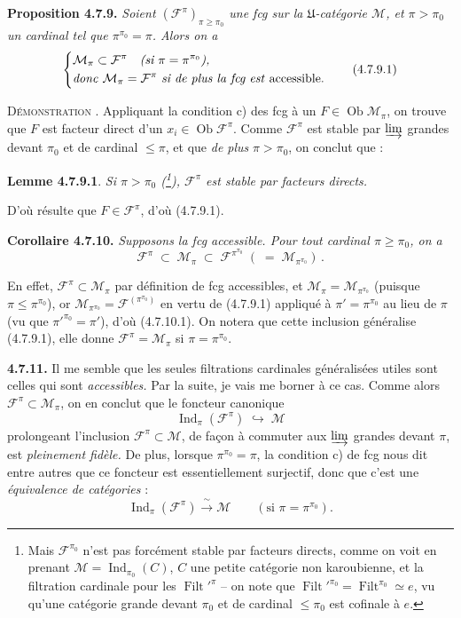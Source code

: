 \documentclass[11pt]{article}
\newcommand{\printedpage}[1]{\marginpar{\footnotesize p.~#1}}
\newcommand{\msp}[1]{\marginpar{\footnotesize [#1]}}
\newcommand{\Filt}{\operatorname{Filt}}
\newcommand{\Ob}{\operatorname{Ob}}
\newcommand{\Ind}{\operatorname{Ind}}
\begin{document}
\textbf{Proposition 4.7.9.} \textit{Soient $(\mathcal{F}^{\pi})_{\pi\geqslant\pi_0}$ une fcg sur la $\mathfrak{U}$-catégorie $\mathcal{M}$, et $\pi>\pi_0$ un cardinal tel que $\pi^{\pi_0}=\pi$. Alors on a}
\printedpage{60}
\msp{page 177}
\[
\left\{
\begin{aligned}
&\mathcal{M}_\pi\subset\mathcal{F}^{\pi}\quad\text{\textit{(si $\pi=\pi^{\pi_0}$),}}\\
&\text{\textit{donc} }\mathcal{M}_\pi=\mathcal{F}^{\pi}\text{ \textit{si de plus la fcg est} accessible.}
\end{aligned}
\right.
\tag*{(4.7.9.1)}
\]

\textsc{Démonstration} . Appliquant la condition c) des fcg à un $F\in\Ob\mathcal{M}_\pi$, on trouve que $F$ est facteur direct d'un $x_i\in\Ob\mathcal{F}^{\pi}$. Comme $\mathcal{F}^{\pi}$ est stable par $\varinjlim$ grandes devant $\pi_0$ et de cardinal $\leqslant\pi$, et que \textit{de plus} $\pi>\pi_0$, on conclut que :

\textbf{Lemme 4.7.9.1}. \textit{Si $\pi>\pi_0$ (\footnote[76]{Mais $\mathcal{F}^{\pi_0}$ n'est pas forcément stable par facteurs directs, comme on voit en prenant $\mathcal{M}=\Ind_{\pi_0}(C)$, $C$ une petite catégorie non karoubienne, et la filtration cardinale pour les $\Filt'^{\pi}$ -- on note que $\Filt'^{\pi_0}=\Filt^{\pi_0}\simeq e$, vu qu'une catégorie grande devant $\pi_0$ et de cardinal $\leqslant\pi_0$ est cofinale à $e$.}), $\mathcal{F}^{\pi}$ est stable par facteurs directs.}

D'où résulte que $F\in\mathcal{F}^{\pi}$, d'où (4.7.9.1).

\textbf{Corollaire 4.7.10.} \textit{Supposons la fcg accessible. Pour tout cardinal $\pi\geqslant\pi_0$, on a}
\[
\mathcal{F}^{\pi} \;\subset\; \mathcal{M}_\pi \;\subset\; \mathcal{F}^{\pi^{\pi_0}} \; ( \;=\; \mathcal{M}_{\pi^{\pi_0}}) \, . \tag*{(4.7.10.1)}
\]

En effet, $\mathcal{F}^{\pi}\subset\mathcal{M}_\pi$ par définition de fcg accessibles, et $\mathcal{M}_\pi=\mathcal{M}_{\pi^{\pi_0}}$ (puisque $\pi\leqslant\pi^{\pi_0}$), or $\mathcal{M}_{\pi^{\pi_0}}=\mathcal{F}^{(\pi^{\pi_0})}$ en vertu de (4.7.9.1) appliqué à $\pi'=\pi^{\pi_0}$ au lieu de $\pi$ (vu que $\pi'^{\pi_0}=\pi'$), d'où (4.7.10.1). On notera que cette inclusion généralise (4.7.9.1), elle donne $\mathcal{F}^{\pi}=\mathcal{M}_\pi$ si $\pi=\pi^{\pi_0}$.

\textbf{4.7.11.} Il me semble que les seules filtrations cardinales généralisées utiles sont celles qui sont \textit{accessibles.} Par la suite, je vais me borner à ce cas. Comme alors $\mathcal{F}^{\pi}\subset\mathcal{M}_\pi$, on en conclut
\msp{page 178}
que le foncteur canonique
\[
\Ind_\pi(\mathcal{F}^{\pi}) \;\hookrightarrow\; \mathcal{M} \tag*{(4.7.11.1)}
\]
prolongeant l'inclusion $\mathcal{F}^{\pi}\subset\mathcal{M}$, de façon à commuter aux $\varinjlim$ grandes devant $\pi$, est \textit{pleinement fidèle.} De plus, lorsque $\pi^{\pi_0}=\pi$, la condition c) de fcg nous dit entre autres que ce foncteur est essentiellement surjectif, donc que c'est une \textit{équivalence de catégories} :
\[
\Ind_\pi(\mathcal{F}^{\pi}) \xrightarrow{\ \sim\ } \mathcal{M} \qquad (\text{si } \pi=\pi^{\pi_0}). \tag*{(4.7.11.2)}
\]
\end{document}
